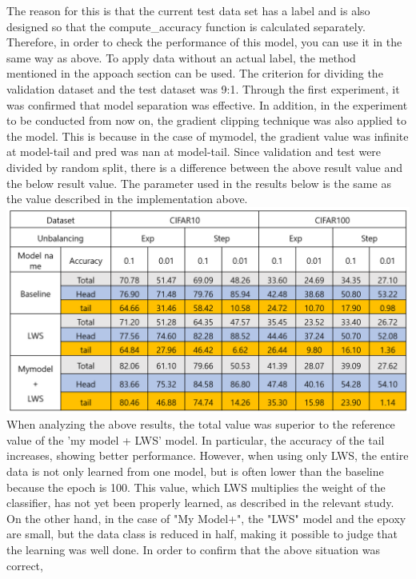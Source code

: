 \documentclass[extendedabs]{bmvc2k}
\begin{document}
  The reason for this is that the current test data set has a label and is also designed so that the compute\_accuracy function is calculated separately. 
  Therefore, in order to check the performance of this model, you can use it in the same way as above. To apply data without an actual label, 
  the method mentioned in the appoach section can be used. The criterion for dividing the validation dataset and the test dataset was 9:1.
  \newline
  \newline Through the first experiment, it was confirmed that model separation was effective. In addition, in the experiment to be conducted from now on, 
  the gradient clipping technique was also applied to the model. This is because in the case of mymodel, the gradient value was infinite at model-tail and pred was nan at model-tail. 
  Since validation and test were divided by random split, there is a difference between the above result value and the below result value. 
  The parameter used in the results below is the same as the value described in the implementation above.
  \newline \includegraphics[width=\linewidth]{images/13_project.PNG}
  When analyzing the above results, the total value was superior to the reference value of the 'my model + LWS' model. In particular, 
  the accuracy of the tail increases, showing better performance. However, when using only LWS, the entire data is not only learned from one model, 
  but is often lower than the baseline because the epoch is 100. This value, which LWS multiplies the weight of the classifier, has not yet been properly learned, 
  as described in the relevant study. On the other hand, in the case of "My Model+", the "LWS" model and the epoxy are small, but the data class is reduced in half, 
  making it possible to judge that the learning was well done. In order to confirm that the above situation was correct, 
\end{document}
